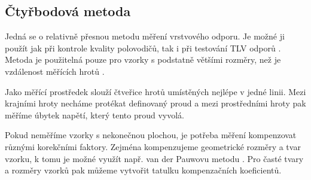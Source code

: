\subsection{Čtyřbodová metoda}
Jedná se o relativně přesnou metodu měření vrstvového odporu. Je možné ji použít jak při kontrole kvality polovodičů, tak i při testování TLV odporů \cite{zadani}. Metoda je použitelná pouze pro vzorky s podstatně většími rozměry, než je vzdálenost měřících hrotů \cite{hrabovsky2012}. 

Jako měřící prostředek slouží čtveřice hrotů umístěných nejlépe v jedné linii. Mezi krajními hroty necháme protékat definovaný proud a mezi prostředními hroty pak měříme úbytek napětí, který tento proud vyvolá. 

Pokud neměříme vzorky s nekonečnou plochou, je potřeba měření kompenzovat různými korekčními faktory. Zejména kompenzujeme geometrické rozměry a tvar vzorku, k tomu je možné využít např. van der Pauwovu metodu \cite{zadani,hrabovsky2012}. Pro časté tvary a rozměry vzorků pak můžeme vytvořit tatulku kompenzačních koeficientů. 